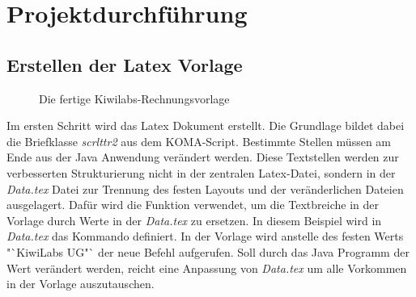 \chapter{Projektdurchführung}
\label{cha:Projektdurchführung}


\section{Erstellen der Latex Vorlage}
\label{sec:Aufbau_HTML}
\begin{figure}[H]
   	\centering
   	\caption{Die fertige Kiwilabs-Rechnungsvorlage}
\end{figure}

Im ersten Schritt wird das Latex Dokument erstellt. Die Grundlage bildet dabei die Briefklasse \textit{scrlttr2} aus dem KOMA-Script. Bestimmte Stellen müssen am Ende aus der Java Anwendung verändert werden. Diese Textstellen werden zur verbesserten Strukturierung nicht in der zentralen Latex-Datei, sondern in der \textit{Data.tex} Datei zur Trennung des festen Layouts und der veränderlichen Dateien ausgelagert. Dafür wird die Funktion  verwendet, um die Textbreiche in der Vorlage durch Werte in der \textit{Data.tex} zu ersetzen. In diesem Beispiel  wird in \textit{Data.tex} das Kommando  definiert.  In der Vorlage wird anstelle des festen Werts "`KiwiLabs UG"` der neue Befehl aufgerufen. Soll durch das Java Programm der Wert verändert werden, reicht eine Anpassung von \textit{Data.tex} um alle Vorkommen in der Vorlage auszutauschen.


